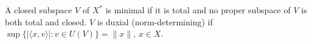 A closed subspace $V$ of $X^*$ is minimal if it is total and no proper subspace of $V$ is both total and closed. $V$ is duxial (norm-determining) if $\sup\{|\langle x, v\rangle| : v \in U(V)\} = \|x\|$, $x \in X$.